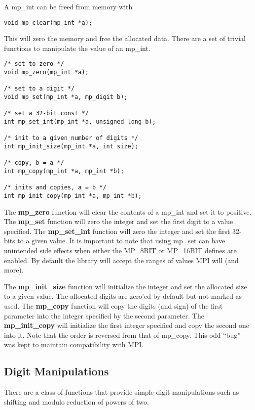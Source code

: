 \documentclass{article}
\begin{document}
A mp\_int can be freed from memory with

\begin{verbatim}
void mp_clear(mp_int *a);
\end{verbatim}

This will zero the memory and free the allocated data.  There are a set of trivial functions to manipulate the 
value of an mp\_int.  

\begin{verbatim}
/* set to zero */
void mp_zero(mp_int *a);

/* set to a digit */
void mp_set(mp_int *a, mp_digit b);

/* set a 32-bit const */
int mp_set_int(mp_int *a, unsigned long b);

/* init to a given number of digits */
int mp_init_size(mp_int *a, int size);

/* copy, b = a */
int mp_copy(mp_int *a, mp_int *b);

/* inits and copies, a = b */
int mp_init_copy(mp_int *a, mp_int *b);
\end{verbatim}

The \textbf{mp\_zero} function will clear the contents of a mp\_int and set it to positive.  The \textbf{mp\_set} function 
will zero the integer and set the first digit to a value specified.  The \textbf{mp\_set\_int} function will zero the 
integer and set the first 32-bits to a given value.  It is important to note that using mp\_set can have unintended 
side effects when either the  MP\_8BIT or MP\_16BIT defines are enabled.  By default the library will accept the 
ranges of values MPI will (and more).

The \textbf{mp\_init\_size} function will initialize the integer and set the allocated size to a given value.  The 
allocated digits are zero'ed by default but not marked as used.  The \textbf{mp\_copy} function will copy the digits
(and sign) of the first parameter into the integer specified by the second parameter.  The \textbf{mp\_init\_copy} will
initialize the first integer specified and copy the second one into it.  Note that the order is reversed from that of
mp\_copy.  This odd ``bug'' was kept to maintain compatibility with MPI.

\subsection{Digit Manipulations}

There are a class of functions that provide simple digit manipulations such as shifting and modulo reduction of powers
of two.  
\end{document}
